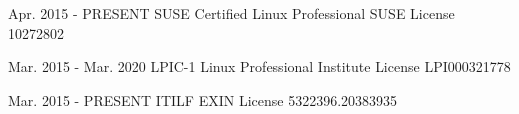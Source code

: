

\begin{cventries}

  \cventry
    {Apr. 2015 - PRESENT} %
    {SUSE Certified Linux Professional} %
    {SUSE} %
    {License 10272802} %
    {}

  \cventry
    {Mar. 2015 - Mar. 2020} %
    {LPIC-1} %
    {Linux Professional Institute} %
    {License LPI000321778} %
    {}

  \cventry
    {Mar. 2015 - PRESENT} %
    {ITILF} %
    {EXIN} %
    {License 5322396.20383935} %
    {}

\end{cventries}
